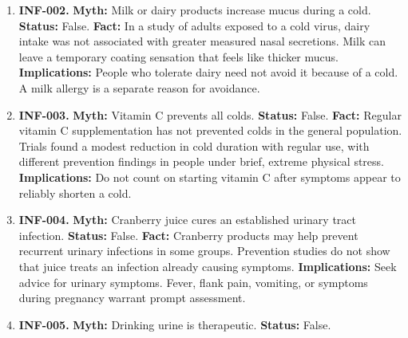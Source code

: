 \documentclass[11pt,oneside]{book}
\begin{document}
\begin{enumerate}[leftmargin=0pt,labelwidth=0pt,labelsep=0pt,itemindent=0pt]
\textbf{Status:} False.\newline
\textbf{Fact:} Neither a cold nor a fever calls for deliberate fasting. Appetite may fall during an illness, while fever and sweating can increase fluid needs. \cite{ref391,ref295}\newline
\textbf{Implications:} Offer fluids and food as tolerated. Seek advice if the person cannot keep fluids down or shows signs of dehydration.
\item[] \textbf{INF-002.} \textbf{Myth:} Milk or dairy products increase mucus during a cold.\newline
\textbf{Status:} False.\newline
\textbf{Fact:} In a study of adults exposed to a cold virus, dairy intake was not associated with greater measured nasal secretions. Milk can leave a temporary coating sensation that feels like thicker mucus. \cite{ref279}\newline
\textbf{Implications:} People who tolerate dairy need not avoid it because of a cold. A milk allergy is a separate reason for avoidance.
\item[] \textbf{INF-003.} \textbf{Myth:} Vitamin C prevents all colds.\newline
\textbf{Status:} False.\newline
\textbf{Fact:} Regular vitamin C supplementation has not prevented colds in the general population. Trials found a modest reduction in cold duration with regular use, with different prevention findings in people under brief, extreme physical stress. \cite{ref280}\newline
\textbf{Implications:} Do not count on starting vitamin C after symptoms appear to reliably shorten a cold.
\item[] \textbf{INF-004.} \textbf{Myth:} Cranberry juice cures an established urinary tract infection.\newline
\textbf{Status:} False.\newline
\textbf{Fact:} Cranberry products may help prevent recurrent urinary infections in some groups. Prevention studies do not show that juice treats an infection already causing symptoms. \cite{ref392,ref281}\newline
\textbf{Implications:} Seek advice for urinary symptoms. Fever, flank pain, vomiting, or symptoms during pregnancy warrant prompt assessment.
\item[] \textbf{INF-005.} \textbf{Myth:} Drinking urine is therapeutic.\newline
\textbf{Status:} False.\newline

\end{enumerate}
\end{document}
